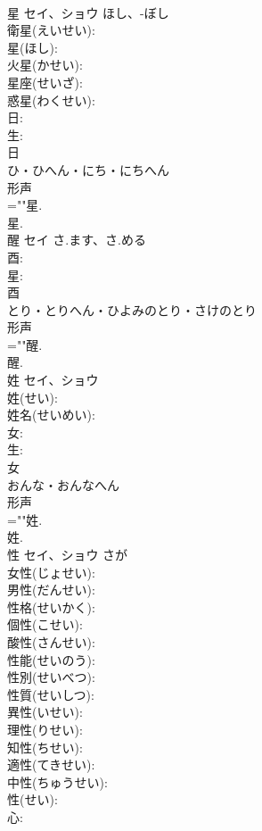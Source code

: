\documentclass[8pt]{extreport}
\begin{document}
\begin{CJK}{UTF8}{min}
\\	星	セイ、ショウ	ほし、-ぼし		
\\	衛星(えいせい): 
\\	星(ほし): 
\\	火星(かせい): 
\\	星座(せいざ): 
\\	惑星(わくせい): 
\\	日: 
\\	生: 
\\	日	
\\	ひ・ひへん・にち・にちへん	
\\	形声 
\\	=""星.
\\	星.
\\	醒	セイ	さ.ます、さ.める		
\\	酉: 
\\	星: 
\\	酉	
\\	とり・とりへん・ひよみのとり・さけのとり	
\\	形声 
\\	=""醒.
\\	醒.
\\	姓	セイ、ショウ			
\\	姓(せい): 
\\	姓名(せいめい): 
\\	女: 
\\	生: 
\\	女	
\\	おんな・おんなへん	
\\	形声 
\\	=""姓.
\\	姓.
\\	性	セイ、ショウ	さが		
\\	女性(じょせい): 
\\	男性(だんせい): 
\\	性格(せいかく): 
\\	個性(こせい): 
\\	酸性(さんせい): 
\\	性能(せいのう): 
\\	性別(せいべつ): 
\\	性質(せいしつ): 
\\	異性(いせい): 
\\	理性(りせい): 
\\	知性(ちせい): 
\\	適性(てきせい): 
\\	中性(ちゅうせい): 
\\	性(せい): 
\\	心: 

\end{CJK}
\end{document}
